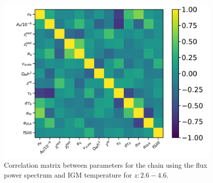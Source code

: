 \begin{figure}
    \centering
    \includegraphics[width=0.98\textwidth]{figures/correlation_z26_46_t0.pdf}
    \caption{\label{fig:correlations}
    Correlation matrix between parameters for the chain using the flux power spectrum and IGM temperature for $z: 2.6-4.6$.
    }
\end{figure}
